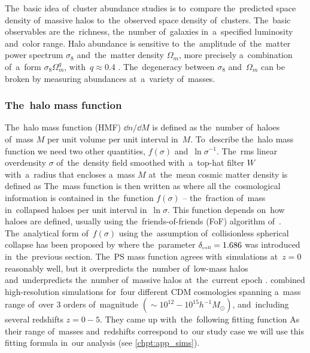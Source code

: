 The~basic idea of~cluster abundance studies is to~compare the~predicted space density of~massive halos to~the~observed space density of~clusters. The~basic observables are the~richness, the~number of~galaxies in~a~specified luminosity and~color range. Halo abundance is sensitive to~the~amplitude of~the~matter power spectrum $\sigma_8$ and~the~matter density $\Omega_m$, more precisely a~combination of~a~form $\sigma_8\Omega_m^q$, with~$q\approx0.4$ \textcite{white}. The~degeneracy between $\sigma_8$ and~$\Omega_m$ can be broken by measuring abundances at~a~variety of~masses.
\subsubsection{The~halo mass function}
The~halo mass function (HMF) $\dd n/\dd M$ is defined as the~number of~haloes of~mass $M$ per unit volume per unit interval in~$M$. To~describe the~halo mass function we need two other quantities, $f(\sigma)$ and~$\ln\sigma^{-1}$. The~rms linear overdensity $\sigma$ of~the~density field smoothed with~a~top-hat filter $W$ with~a~radius that encloses a~mass $M$ at~the~mean cosmic matter density is defined as \parencite{2015IJMPD..2430004B}
The~mass function is then written as
where all the~cosmological information is contained in~the~function \(f(\sigma)\) --  the~fraction of~mass in~collapsed haloes per unit interval in~$\ln\sigma$. This function depends on~how haloes are defined, usually using the~friends-of-friends (FoF) algorithm of~\textcite{1985ApJ...292..371D}. The~analytical form of~$f(\sigma)$ using the~assumption of~collisionless spherical collapse has been proposed by \textcite{1974ApJ...187..425P}
where the~parameter \(\delta_\text{\tiny coll}=1.686\) was introduced in~the~previous section. The~PS mass function agrees with~simulations at~$z=0$ reasonably well, but it overpredicts the~number of~low-mass halos and~underpredicts the~number of~massive halos at~the~current epoch \parencite{2007ApJ...671.1160L}. \textcite{2001MNRAS.321..372J} combined high-resolution simulations for~four different CDM cosmologies spanning a~mass range of~over 3 orders of~magnitude $(\sim10^{12}-10^{15}h^{-1}M_\odot)$, and~including several redshifts $z=0-5$. They came up with~the~following fitting function
As their range of~masses and~redshifts correspond to~our study case we will use this fitting formula in~our analysis (see \autoref{chpt:app_sims}).
